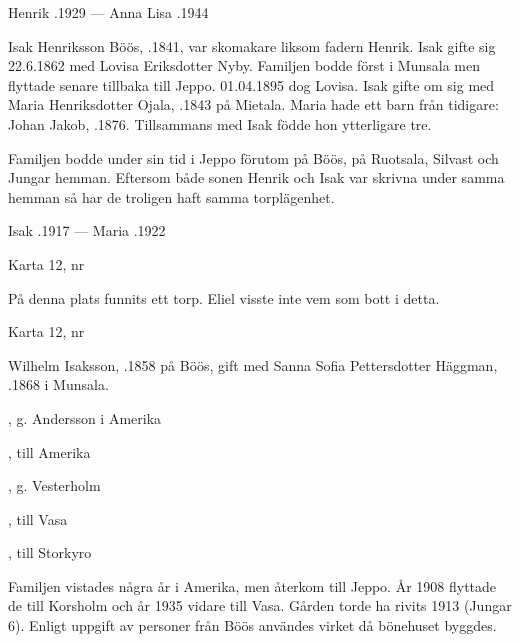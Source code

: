 Henrik .1929  ---  Anna Lisa .1944


%
Isak Henriksson Böös, .1841, var skomakare liksom fadern Henrik. Isak gifte sig 22.6.1862 med Lovisa Eriksdotter Nyby. Familjen bodde först i Munsala men flyttade senare tillbaka till Jeppo. 01.04.1895 dog Lovisa. Isak gifte om sig med Maria Henriksdotter Ojala, .1843 på Mietala. Maria hade ett barn från tidigare: Johan Jakob, .1876. Tillsammans med Isak födde hon ytterligare tre.
\begin{jhchildren}
  \item {}
  \item {}
  \item {}
\end{jhchildren}
Familjen bodde under sin tid i Jeppo förutom på Böös, på Ruotsala, Silvast och Jungar hemman. Eftersom både sonen Henrik och Isak var skrivna under samma hemman så har de troligen haft samma torplägenhet.

Isak .1917  ---  Maria .1922


Karta 12,   nr 

På denna plats funnits ett torp. Eliel visste inte vem som bott i detta.


Karta 12,   nr 


%
Wilhelm Isaksson, .1858 på Böös, gift med Sanna Sofia Pettersdotter Häggman, .1868 i Munsala.
\begin{jhchildren}
  \item {}, g. Andersson i Amerika
  \item {}, till Amerika
  \item {}
  \item {}, g. Vesterholm
  \item {}, till Vasa
  \item {}, till Storkyro
\end{jhchildren}
Familjen vistades några år i Amerika, men återkom till Jeppo. År 1908 flyttade de till Korsholm och år 1935 vidare till Vasa. Gården torde ha rivits 1913 (Jungar 6). Enligt uppgift av personer från Böös användes virket då bönehuset byggdes.

